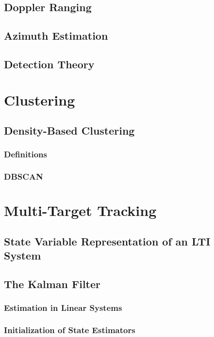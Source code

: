 \documentclass[DIV=15,
fleqn
numbers=noenddot,
headsepline,
captions=tableabove,twoside, openright]{scrreprt}
\begin{document}
\section{Doppler Ranging}\label{bs:dopplerRanging}
\section{Azimuth Estimation}
\section{Detection Theory}\label{bs:detection}
\chapter{Clustering}\label{ch:cluster}

\section{Density-Based Clustering}\label{cs:Density}

\subsection{Definitions}\label{cs:Def}

\subsection{DBSCAN}\label{cs:dbscan}

\chapter{Multi-Target Tracking}

\section{State Variable Representation of an LTI System}\label{mtt:state}

\section{The Kalman Filter}\label{mtt:kalman}
 
 \subsection{Estimation in Linear Systems}
 
\subsection{Initialization of State Estimators}

\end{document}
